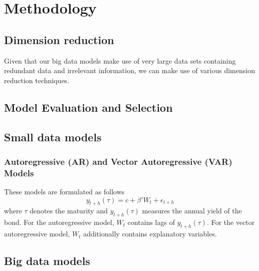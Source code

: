 \section{Methodology}
\subsection{Dimension reduction}
Given that our big data models make use of very large data sets containing redundant data and irrelevant information, we can make use of various dimension reduction techniques. 

\subsection{Model Evaluation and Selection}

\subsection{Small data models}
\subsubsection{Autoregressive (AR) and Vector Autoregressive (VAR) Models}
These models are formulated as follows
\[
y_{t+h}(\tau) = c + \beta' W_t + \epsilon_{t+h}
\]
where $\tau$ denotes the maturity and $y_{t+h}(\tau)$ measures the annual yield of the bond. For the autoregressive model, $W_t$ contains lags of $y_{t+h}(\tau)$. For the vector autoregressive model, $W_t$ additionally contains explanatory variables. 

\subsection{Big data models}